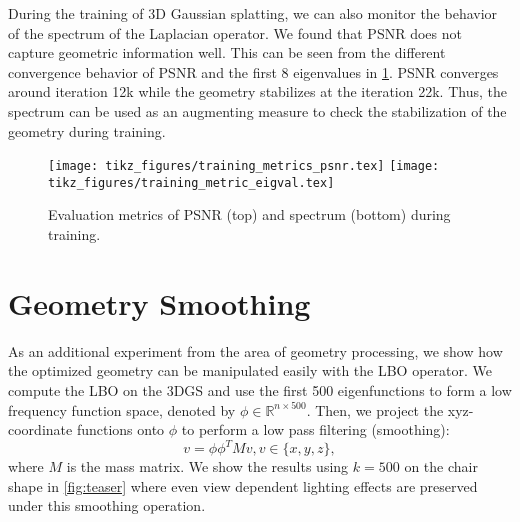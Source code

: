 \begin{table}
\centering
\caption{Comparison of the size of different representations. For the mesh we report the number of vertices. For 3D Gaussian splatting we report the number of 3D Gaussian splats.}
\label{table:size}
\end{table}

During the training of 3D Gaussian splatting, we can also monitor the behavior of the spectrum of the Laplacian operator. We found that PSNR does not capture geometric information well. This can be seen from the different convergence behavior of PSNR and the first 8 eigenvalues in \cref{fig:training}. PSNR converges around iteration 12k while the geometry stabilizes at the iteration 22k. Thus, the spectrum can be used as an augmenting measure to check the stabilization of the geometry during training.


\begin{figure}[ht]
    \texttt{[image: tikz\_figures/training\_metrics\_psnr.tex]}
    \texttt{[image: tikz\_figures/training\_metric\_eigval.tex]}
    \caption{Evaluation metrics of PSNR (top) and spectrum (bottom) during training.}
    \label{fig:training}
\end{figure}



\section{Geometry Smoothing}
As an additional experiment from the area of geometry processing, we show how the optimized geometry can be manipulated easily with the LBO operator. 
We compute the LBO on the 3DGS and use the first 500 eigenfunctions to form a low frequency function space, denoted by $\phi \in \mathbb{R}^{n \times 500}$. %
Then, we project the xyz-coordinate functions onto $\phi$ to perform a low pass filtering (smoothing): $$v = \phi\phi^TM v, v \in\{x, y, z\},$$ where $M$ is the mass matrix.
We show the results using $k=500$ on the chair shape in \cref{fig:teaser} where even view dependent lighting effects are preserved under this smoothing operation.
